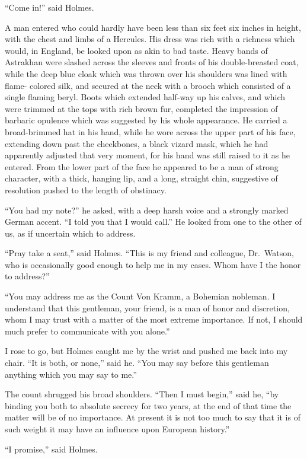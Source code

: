 “Come in!” said Holmes.

A man entered who could hardly have been less than six
feet six inches in height, with the chest and limbs of a
Hercules. His dress was rich with a richness which would,
in England, be looked upon as akin to bad taste. Heavy
bands of Astrakhan were slashed across the sleeves and
fronts of his double-breasted coat, while the deep blue cloak
which was thrown over his shoulders was lined with flame-%
colored silk, and secured at the neck with a brooch which
consisted of a single flaming beryl. Boots which extended
half-way up his calves, and which were trimmed at the tops
with rich brown fur, completed the impression of barbaric
opulence which was suggested by his whole appearance. He
carried a broad-brimmed hat in his hand, while he wore across
the upper part of his face, extending down past the cheekbones,
a black vizard mask, which he had apparently adjusted
that very moment, for his hand was still raised to it as he
entered. From the lower part of the face he appeared to be
a man of strong character, with a thick, hanging lip, and a
long, straight chin, suggestive of resolution pushed to the
length of obstinacy.

“You had my note?” he asked, with a deep harsh voice
and a strongly marked German accent. “I told you that I
would call.” He looked from one to the other of us, as if
uncertain which to address.

“Pray take a seat,” said Holmes. “This is my friend and
colleague, Dr.\ Watson, who is occasionally good enough to
help me in my cases. Whom have I the honor to address?”

“You may address me as the Count Von Kramm, a Bohemian
nobleman. I understand that this gentleman, your
friend, is a man of honor and discretion, whom I may trust
with a matter of the most extreme importance. If not, I
should much prefer to communicate with you alone.”

I rose to go, but Holmes caught me by the wrist and pushed
me back into my chair. “It is both, or none,” said he.
“You may say before this gentleman anything which you may
say to me.”

The count shrugged his broad shoulders. “Then I must
begin,” said he, “by binding you both to absolute secrecy for
two years, at the end of that time the matter will be of no
importance. At present it is not too much to say that it is of
such weight it may have an influence upon European history.”

“I promise,” said Holmes.

